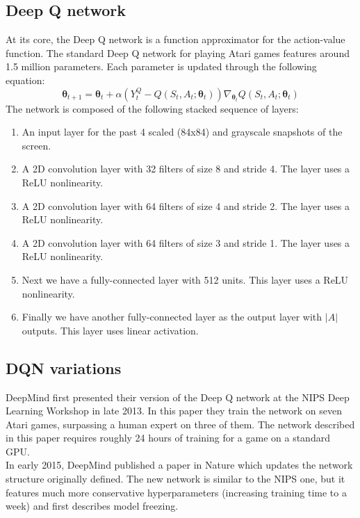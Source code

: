 \documentclass{article}
\begin{document}
\subsection{Deep Q network}
  At its core, the Deep Q network is a function approximator for the action-value function. The standard Deep Q network for playing Atari games features around 1.5 million parameters. Each parameter is updated through the following equation:
  \[ \boldsymbol{\theta}_{t+1} = \boldsymbol{\theta}_t+\alpha(Y_t^Q-Q(S_t,A_t;\boldsymbol{\theta}_t))\nabla_{\boldsymbol{\theta}_t}Q(S_t,A_t;\boldsymbol{\theta}_t) \]
  The network is composed of the following stacked sequence of layers:
  \begin{enumerate}
    \item An input layer for the past 4 scaled (84x84) and grayscale snapshots of the screen.
    \item A 2D convolution layer with 32 filters of size 8 and stride 4. The layer uses a ReLU nonlinearity.
    \item A 2D convolution layer with 64 filters of size 4 and stride 2. The layer uses a ReLU nonlinearity.
    \item A 2D convolution layer with 64 filters of size 3 and stride 1. The layer uses a ReLU nonlinearity.
    \item Next we have a fully-connected layer with 512 units. This layer uses a ReLU nonlinearity.
    \item Finally we have another fully-connected layer as the output layer with $|A|$ outputs. This layer uses linear activation.
  \end{enumerate}

\subsection{DQN variations}
  DeepMind first presented their version of the Deep Q network at the NIPS Deep Learning Workshop in late 2013. In this paper they train the network on seven Atari games, surpassing a human expert on three of them. The network described in this paper requires roughly 24 hours of training for a game on a standard GPU.\\

  In early 2015, DeepMind published a paper in Nature which updates the network structure originally defined. The new network is similar to the NIPS one, but it features much more conservative hyperparameters (increasing training time to a week) and first describes model freezing. \\
\end{document}
